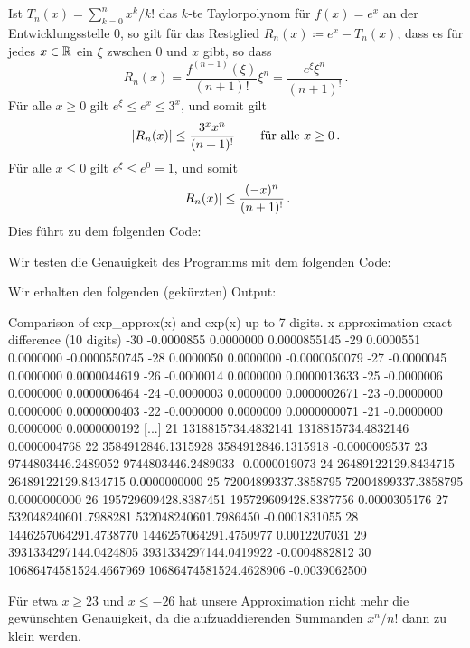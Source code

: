 \section{}

Ist $T_n(x) = \sum_{k=0}^n x^k/k!$ das $k$-te Taylorpolynom für $f(x) = e^x$ an der Entwicklungsstelle $0$, so gilt für das Restglied $R_n(x) \coloneqq e^x - T_n(x)$, dass es für jedes $x \in \mathbb{R}$ ein $\xi$ zwschen $0$ und $x$ gibt, so dass
\[
    R_n(x)
  = \frac{f^{(n+1)}(\xi)}{(n+1)!} \xi^n
  = \frac{e^\xi \xi^n}{(n+1)^!}\,.
\]
Für alle $x \geq 0$ gilt $e^\xi \leq e^x \leq 3^x$, und somit gilt
\[
        \lvert R_n(x)\rvert
  \leq  \frac{3^x x^n}{(n+1)^!}
  \qquad
  \text{für alle $x \geq 0$}\,.
\]
Für alle $x \leq 0$ gilt $e^\xi \leq e^0 = 1$, und somit
\[
        \lvert R_n(x)\rvert
  \leq  \frac{(-x)^n}{(n+1)^!}\,.
\]
Dies führt zu dem folgenden Code:



Wir testen die Genauigkeit des Programms mit dem folgenden Code:



Wir erhalten den folgenden (gekürzten) Output:
\begin{consoleoutput}
Comparison of exp_approx(x) and exp(x) up to 7 digits.
  x            approximation                    exact   difference (10 digits)
-30               -0.0000855                0.0000000    0.0000855145
-29                0.0000551                0.0000000   -0.0000550745
-28                0.0000050                0.0000000   -0.0000050079
-27               -0.0000045                0.0000000    0.0000044619
-26               -0.0000014                0.0000000    0.0000013633
-25               -0.0000006                0.0000000    0.0000006464
-24               -0.0000003                0.0000000    0.0000002671
-23               -0.0000000                0.0000000    0.0000000403
-22               -0.0000000                0.0000000    0.0000000071
-21               -0.0000000                0.0000000    0.0000000192
[...]
 21       1318815734.4832141       1318815734.4832146    0.0000004768
 22       3584912846.1315928       3584912846.1315918   -0.0000009537
 23       9744803446.2489052       9744803446.2489033   -0.0000019073
 24      26489122129.8434715      26489122129.8434715    0.0000000000
 25      72004899337.3858795      72004899337.3858795    0.0000000000
 26     195729609428.8387451     195729609428.8387756    0.0000305176
 27     532048240601.7988281     532048240601.7986450   -0.0001831055
 28    1446257064291.4738770    1446257064291.4750977    0.0012207031
 29    3931334297144.0424805    3931334297144.0419922   -0.0004882812
 30   10686474581524.4667969   10686474581524.4628906   -0.0039062500
\end{consoleoutput}

Für etwa $x \geq 23$ und $x \leq -26$ hat unsere Approximation nicht mehr die gewünschten Genauigkeit, da die aufzuaddierenden Summanden $x^n/n!$ dann zu klein werden.




